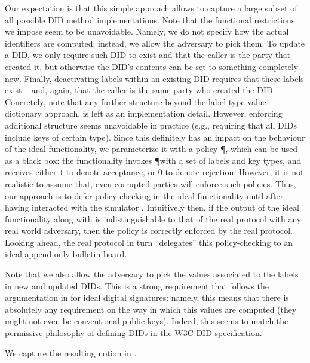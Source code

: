 Our expectation is that this simple approach allows to capture a large
subset of all possible DID method implementations. Note that the functional
restrictions we impose seem to be unavoidable. Namely, we do not specify how
the actual identifiers are computed; instead, we allow the adversary to pick
them. To update a DID, we only require such DID to exist and that the caller
is the party that created it, but otherwise the DID's contents can be set to
something completely new. Finally, deactivating labels within an existing DID
requires that these labels exist -- and, again, that the caller is the same
party who created the DID. Concretely, note that any further structure beyond
the label-type-value dictionary approach, is left as an implementation detail.
However, enforcing additional structure seems unavoidable in practice (e.g.,
requiring that all DIDs include keys of certain type). Since this definitely
has an impact on the behaviour of the ideal functionality, we parameterize it
with a policy \P, which can be used as a black box: the functionality invokes
\P with a set of labels and key types, and receives either $1$ to denote
acceptance, or $0$ to denote rejection. However, it is not realistic to assume
that, even corrupted parties will enforce such policies. Thus, our approach is
to defer policy checking in the ideal functionality until after having
interacted with the simulator \Sim. Intuitively then, if the output of the
ideal functionality along with \Sim is indistinguishable to that of the real
protocol with any real world adversary, then the policy is correctly enforced
by the real protocol. Looking ahead, the real protocol in turn ``delegates''
this policy-checking to an ideal append-only bulletin board. 

Note that we also allow the adversary to pick the values associated to the
labels in new and updated DIDs. This is a strong requirement that follows the
argumentation in \cite{canetti03} for ideal digital signatures: namely, this
means that there is absolutely any requirement on the way in which this values
are computed (they might not even be conventional public keys). Indeed, this
seems to match the permissive philosophy of defining DIDs in the W3C DID
specification.

We capture the resulting notion in .

